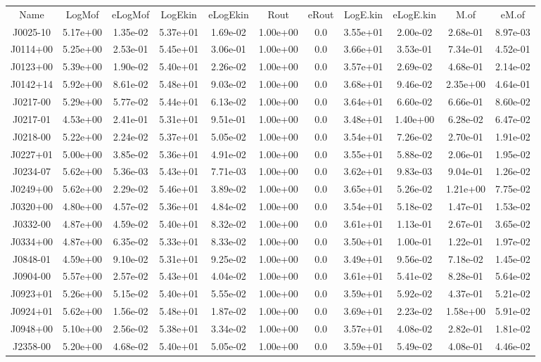 \begin{table}
\begin{tabular}{ccccccccccc}
Name & LogMof & eLogMof & LogEkin & eLogEkin & Rout & eRout & LogE.kin & eLogE.kin & M.of & eM.of \\
J0025-10 & 5.17e+00 & 1.35e-02 & 5.37e+01 & 1.69e-02 & 1.00e+00 & 0.0 & 3.55e+01 & 2.00e-02 & 2.68e-01 & 8.97e-03 \\
J0114+00 & 5.25e+00 & 2.53e-01 & 5.45e+01 & 3.06e-01 & 1.00e+00 & 0.0 & 3.66e+01 & 3.53e-01 & 7.34e-01 & 4.52e-01 \\
J0123+00 & 5.39e+00 & 1.90e-02 & 5.40e+01 & 2.26e-02 & 1.00e+00 & 0.0 & 3.57e+01 & 2.69e-02 & 4.68e-01 & 2.14e-02 \\
J0142+14 & 5.92e+00 & 8.61e-02 & 5.48e+01 & 9.03e-02 & 1.00e+00 & 0.0 & 3.68e+01 & 9.46e-02 & 2.35e+00 & 4.64e-01 \\
J0217-00 & 5.29e+00 & 5.77e-02 & 5.44e+01 & 6.13e-02 & 1.00e+00 & 0.0 & 3.64e+01 & 6.60e-02 & 6.66e-01 & 8.60e-02 \\
J0217-01 & 4.53e+00 & 2.41e-01 & 5.31e+01 & 9.51e-01 & 1.00e+00 & 0.0 & 3.48e+01 & 1.40e+00 & 6.28e-02 & 6.47e-02 \\
J0218-00 & 5.22e+00 & 2.24e-02 & 5.37e+01 & 5.05e-02 & 1.00e+00 & 0.0 & 3.54e+01 & 7.26e-02 & 2.70e-01 & 1.91e-02 \\
J0227+01 & 5.00e+00 & 3.85e-02 & 5.36e+01 & 4.91e-02 & 1.00e+00 & 0.0 & 3.55e+01 & 5.88e-02 & 2.06e-01 & 1.95e-02 \\
J0234-07 & 5.62e+00 & 5.36e-03 & 5.43e+01 & 7.71e-03 & 1.00e+00 & 0.0 & 3.62e+01 & 9.83e-03 & 9.04e-01 & 1.26e-02 \\
J0249+00 & 5.62e+00 & 2.29e-02 & 5.46e+01 & 3.89e-02 & 1.00e+00 & 0.0 & 3.65e+01 & 5.26e-02 & 1.21e+00 & 7.75e-02 \\
J0320+00 & 4.80e+00 & 4.57e-02 & 5.36e+01 & 4.84e-02 & 1.00e+00 & 0.0 & 3.54e+01 & 5.18e-02 & 1.47e-01 & 1.53e-02 \\
J0332-00 & 4.87e+00 & 4.59e-02 & 5.40e+01 & 8.32e-02 & 1.00e+00 & 0.0 & 3.61e+01 & 1.13e-01 & 2.67e-01 & 3.65e-02 \\
J0334+00 & 4.87e+00 & 6.35e-02 & 5.33e+01 & 8.33e-02 & 1.00e+00 & 0.0 & 3.50e+01 & 1.00e-01 & 1.22e-01 & 1.97e-02 \\
J0848-01 & 4.59e+00 & 9.10e-02 & 5.31e+01 & 9.25e-02 & 1.00e+00 & 0.0 & 3.49e+01 & 9.56e-02 & 7.18e-02 & 1.45e-02 \\
J0904-00 & 5.57e+00 & 2.57e-02 & 5.43e+01 & 4.04e-02 & 1.00e+00 & 0.0 & 3.61e+01 & 5.41e-02 & 8.28e-01 & 5.64e-02 \\
J0923+01 & 5.26e+00 & 5.15e-02 & 5.40e+01 & 5.55e-02 & 1.00e+00 & 0.0 & 3.59e+01 & 5.92e-02 & 4.37e-01 & 5.21e-02 \\
J0924+01 & 5.62e+00 & 1.56e-02 & 5.48e+01 & 1.87e-02 & 1.00e+00 & 0.0 & 3.69e+01 & 2.23e-02 & 1.58e+00 & 5.91e-02 \\
J0948+00 & 5.10e+00 & 2.56e-02 & 5.38e+01 & 3.34e-02 & 1.00e+00 & 0.0 & 3.57e+01 & 4.08e-02 & 2.82e-01 & 1.81e-02 \\
J2358-00 & 5.20e+00 & 4.68e-02 & 5.40e+01 & 5.05e-02 & 1.00e+00 & 0.0 & 3.59e+01 & 5.49e-02 & 4.08e-01 & 4.46e-02 \\
\end{tabular}
\end{table}
